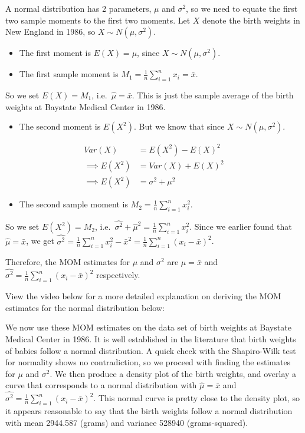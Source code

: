 \documentclass[
]{book}
\providecommand{\tightlist}{%
  \setlength{\itemsep}{0pt}\setlength{\parskip}{0pt}}
\begin{document}
A normal distribution has 2 parameters, \(\mu\) and \(\sigma^2\), so we need to equate the first two sample moments to the first two moments. Let \(X\) denote the birth weights in New England in 1986, so \(X \sim N(\mu, \sigma^2)\).

\begin{itemize}
\tightlist
\item
  The first moment is \(E(X) = \mu\), since \(X \sim N(\mu, \sigma^2)\).
\item
  The first sample moment is \(M_1 = \frac{1}{n} \sum_{i=1}^n x_i = \bar{x}\).
\end{itemize}

So we set \(E(X) = M_1\), i.e.~\(\hat{\mu} = \bar{x}\). This is just the sample average of the birth weights at Baystate Medical Center in 1986.

\begin{itemize}
\tightlist
\item
  The second moment is \(E(X^2)\). But we know that since \(X \sim N(\mu, \sigma^2)\).
\end{itemize}

\[
\begin{split}
Var(X) &= E(X^2) - E(X)^2\\
\implies E(X^2) &= Var(X) + E(X)^2 \\
\implies E(X^2) &= \sigma^2 + \mu^2
\end{split}
\]

\begin{itemize}
\tightlist
\item
  The second sample moment is \(M_2 = \frac{1}{n} \sum_{i=1}^n x_i^2\).
\end{itemize}

So we set \(E(X^2) = M_2\), i.e.~\(\hat{\sigma^2} + \hat{\mu}^2 = \frac{1}{n} \sum_{i=1}^n x_i^2\). Since we earlier found that \(\hat{\mu} = \bar{x}\), we get \(\hat{\sigma^2} = \frac{1}{n} \sum_{i=1}^n x_i^2 - \bar{x}^2 = \frac{1}{n} \sum_{i=1}^n (x_i - \bar{x})^2\).

Therefore, the MOM estimates for \(\mu\) and \(\sigma^2\) are \(\hat{\mu} = \bar{x}\) and \(\hat{\sigma^2} = \frac{1}{n} \sum_{i=1}^n (x_i - \bar{x})^2\) respectively.

View the video below for a more detailed explanation on deriving the MOM estimates for the normal distribution below:

We now use these MOM estimates on the data set of birth weights at Baystate Medical Center in 1986. It is well established in the literature that birth weights of babies follow a normal distribution. A quick check with the Shapiro-Wilk test for normality shows no contradiction, so we proceed with finding the estimates for \(\mu\) and \(\sigma^2\). We then produce a density plot of the birth weights, and overlay a curve that corresponds to a normal distribution with \(\hat{\mu} = \bar{x}\) and \(\hat{\sigma^2} = \frac{1}{n} \sum_{i=1}^n (x_i - \bar{x})^2\). This normal curve is pretty close to the density plot, so it appears reasonable to say that the birth weights follow a normal distribution with mean 2944.587 (grams) and variance 528940 (grams-squared).
\end{document}
